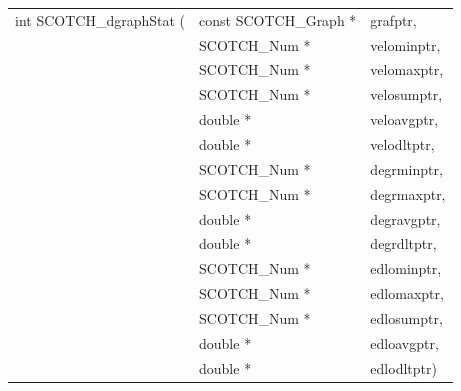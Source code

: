 \begin{itemize}
\progsyn

{\tt\begin{tabular}{l@{}ll}
int SCOTCH\_dgraphStat ( & const SCOTCH\_Graph * & grafptr,    \\
                         & SCOTCH\_Num *         & velominptr, \\
                         & SCOTCH\_Num *         & velomaxptr, \\
                         & SCOTCH\_Num *         & velosumptr, \\
                         & double *              & veloavgptr, \\
                         & double *              & velodltptr, \\
                         & SCOTCH\_Num *         & degrminptr, \\
                         & SCOTCH\_Num *         & degrmaxptr, \\
                         & double *              & degravgptr, \\
                         & double *              & degrdltptr, \\
                         & SCOTCH\_Num *         & edlominptr, \\
                         & SCOTCH\_Num *         & edlomaxptr, \\
                         & SCOTCH\_Num *         & edlosumptr, \\
                         & double *              & edloavgptr, \\
                         & double *              & edlodltptr)
\end{tabular}}


\end{itemize}
